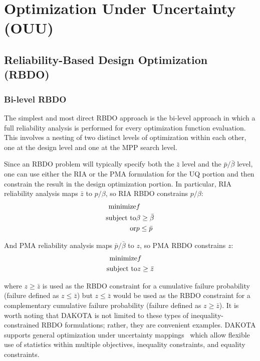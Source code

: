 \chapter{Optimization Under Uncertainty (OUU)}\label{ouu}

\section{Reliability-Based Design Optimization (RBDO)}\label{ouu:rbdo}

\subsection{Bi-level RBDO} \label{ouu:rbdo:bilev}

The simplest and most direct RBDO approach is the bi-level approach in
which a full reliability analysis is performed for every optimization
function evaluation.  This involves a nesting of two distinct levels
of optimization within each other, one at the design level and one at
the MPP search level.

Since an RBDO problem will typically specify both the $\bar{z}$ level
and the $\bar{p}/\bar{\beta}$ level, one can use either the RIA or the
PMA formulation for the UQ portion and then constrain the result in
the design optimization portion.  In particular, RIA reliability
analysis maps $\bar{z}$ to $p/\beta$, so RIA RBDO constrains $p/\beta$:
\begin{eqnarray}
  {\rm minimize }     & f \nonumber \\
  {\rm subject \ to } & \beta \ge \bar{\beta} \nonumber \\
  {\rm or }           & p \le \bar{p} \label{eq:rbdo_ria}
\end{eqnarray}

\noindent And PMA reliability analysis maps $\bar{p}/\bar{\beta}$ to 
$z$, so PMA RBDO constrains $z$:
\begin{eqnarray}
  {\rm minimize }     & f \nonumber \\
  {\rm subject \ to } & z \ge \bar{z} \label{eq:rbdo_pma}
\end{eqnarray}

\noindent where $z \ge \bar{z}$ is used as the RBDO constraint for 
a cumulative failure probability (failure defined as $z \le \bar{z}$)
but $z \le \bar{z}$ would be used as the RBDO constraint for a
complementary cumulative failure probability (failure defined as $z
\ge \bar{z}$).  It is worth noting that DAKOTA is not limited to these
types of inequality-constrained RBDO formulations; rather, they are
convenient examples.  DAKOTA supports general optimization under
uncertainty mappings~\cite{Eld02} which allow flexible use of
statistics within multiple objectives, inequality constraints, and
equality constraints.

